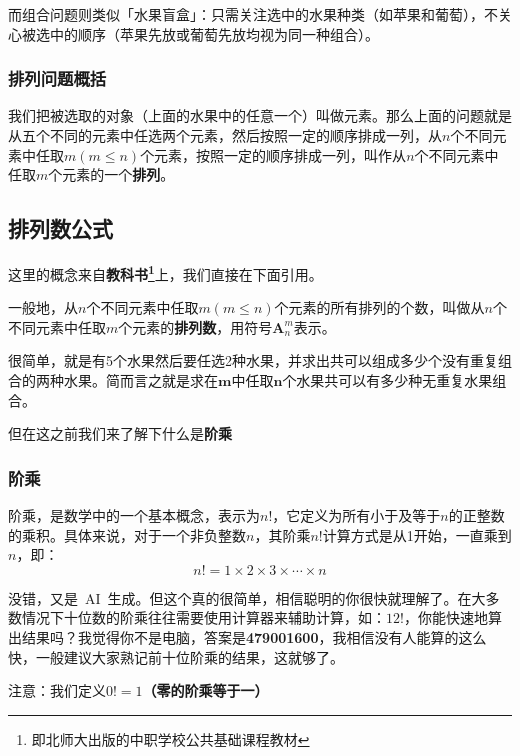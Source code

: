 而组合问题则类似「水果盲盒」：只需关注选中的水果种类（如苹果和葡萄），不关心被选中的顺序（苹果先放或葡萄先放均视为同一种组合）。

\subsubsection{排列问题概括}

我们把被选取的对象（上面的水果中的任意一个）叫做元素。那么上面的问题就是从五个不同的元素中任选两个元素，然后按照一定的顺序排成一列，从$\mathit{n}$个不同元素中任取$m(m \le n)$个元素，按照一定的顺序排成一列，叫作从$\mathit{n}$个不同元素中任取$\mathit{m}$个元素的一个\textbf{排列}。

\subsection{排列数公式}
这里的概念来自\textbf{教科书\footnote{即北师大出版的中职学校公共基础课程教材}}上，我们直接在下面引用。

一般地，从$\mathit{n}$个不同元素中任取$m(m \le n)$个元素的所有排列的个数，叫做从$\mathit{n}$个不同元素中任取$\mathit{m}$个元素的\textbf{排列数}，用符号$\textbf{A}_{n}^{m}$表示。

很简单，就是有5个水果然后要任选2种水果，并求出共可以组成多少个没有重复组合的两种水果。简而言之就是求在$\textbf{m}$中任取$\textbf{n}$个水果共可以有多少种无重复水果组合。

但在这之前我们来了解下什么是\textbf{阶乘}

\subsubsection{阶乘}\label{sec:factorial}
阶乘，是数学中的一个基本概念，表示为$n!$，它定义为所有小于及等于$n$的正整数的乘积。具体来说，对于一个非负整数$n$，其阶乘$n!$计算方式是从1开始，一直乘到$n$，即：
\begin{equation*}
    n! = 1 \times 2 \times 3 \times \cdots \times n
\end{equation*}

没错，又是~AI~生成。但这个真的很简单，相信聪明的你很快就理解了。在大多数情况下十位数的阶乘往往需要使用计算器来辅助计算，如：$12!$，你能快速地算出结果吗？我觉得你不是电脑，答案是\textbf{479001600}，我相信没有人能算的这么快，一般建议大家熟记前十位阶乘的结果，这就够了。

\begin{flushleft}
	{\color{red} 注意：}我们定义\textbf{$0! = 1$（零的阶乘等于一）}
\end{flushleft}

